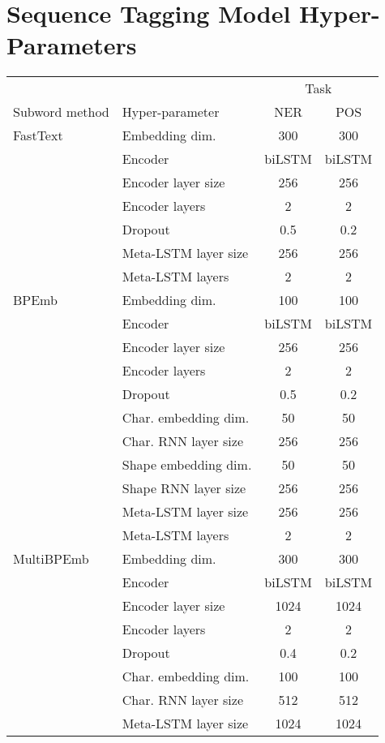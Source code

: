 \documentclass[11pt,a4paper]{article}
\begin{document}
\newpage
\onecolumn
\section{Sequence Tagging Model Hyper-Parameters}
\label{sec:hyper-parameters}
\begin{table}[h!]
	\centering
	\small
	\begin{tabular}{l|l|cc}
		\toprule
		 & & \multicolumn{2}{c}{Task} \\
		Subword method & Hyper-parameter & NER & POS \\
		\midrule
		FastText & Embedding dim. & 300 & 300 \\
		 & Encoder & biLSTM & biLSTM \\
		 & Encoder layer size & 256 & 256 \\
		 & Encoder layers & 2 & 2 \\
		 & Dropout & 0.5 & 0.2 \\
		 & Meta-LSTM layer size & 256 & 256 \\
		 & Meta-LSTM layers & 2 & 2 \\
		\midrule
		BPEmb & Embedding dim. & 100 & 100 \\
		 & Encoder & biLSTM & biLSTM \\
		 & Encoder layer size & 256 & 256 \\
		 & Encoder layers & 2 & 2 \\
		 & Dropout & 0.5 & 0.2 \\
		 & Char. embedding dim. & 50 & 50 \\
		 & Char. RNN layer size & 256 & 256 \\
		 & Shape embedding dim. & 50 & 50 \\
		 & Shape RNN layer size & 256 & 256 \\
		 & Meta-LSTM layer size & 256 & 256 \\
		 & Meta-LSTM layers & 2 & 2 \\
		\midrule
		MultiBPEmb & Embedding dim. & 300 & 300 \\
		 & Encoder & biLSTM & biLSTM \\
		 & Encoder layer size & 1024 & 1024 \\
		 & Encoder layers & 2 & 2 \\
		 & Dropout & 0.4 & 0.2 \\
		 & Char. embedding dim. & 100 & 100 \\
		 & Char. RNN layer size & 512 & 512 \\
		 & Meta-LSTM layer size & 1024 & 1024 \\

\end{tabular}
\end{table}
\end{document}
